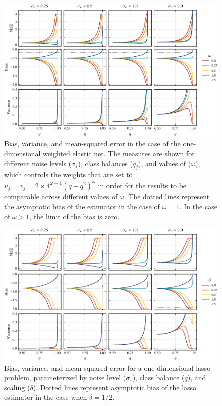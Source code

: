 \begin{figure}[htpb]
  \centering
  \includegraphics[]{plots/binary_onedim_bias_var_elnet.pdf}
  \caption{%
    Bias, variance, and mean-squared error in the case of the one-dimensional weighted elastic
    net. The measures are shown for different noise levels (\(\sigma_\varepsilon\)), class
    balances (\(q_j\)), and values of (\(\omega\)), which controls the weights that are set to
    \(u_j = v_j = 2\times 4^{\omega - 1}(q-q^2)^\omega\) in order for the results to be
    comparable across different values of \(\omega\). The dotted lines represent the asymptotic
    bias of the estimator in the case of \(\omega = 1\). In the case of \(\omega > 1\), the
    limit of the bias is zero.
  }
  \label{fig:binary-onedim-bias-var-elnet}
\end{figure}

\begin{figure}[htpb]
  \centering
  \includegraphics[]{plots/binary_onedim_bias_var_lasso.pdf}
  \caption{%
    Bias, variance, and mean-squared error for a one-dimensional lasso problem,
    parameterized by noise level (\(\sigma_\varepsilon\)), class balance (\(q\)), and
    scaling (\(\delta\)). Dotted lines represent asymptotic bias of the lasso
    estimator in the case when \(\delta = 1/2\).}
  \label{fig:bias-var-onedim-lasso-full}
\end{figure}

